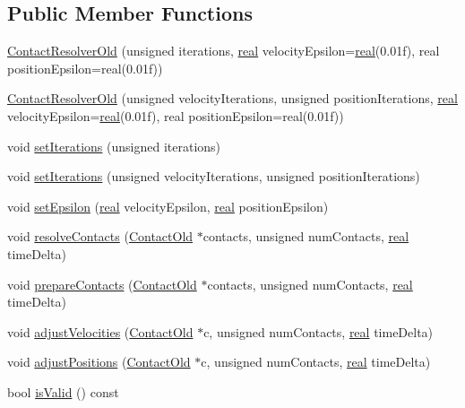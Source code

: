 \subsection*{Public Member Functions}
\begin{DoxyCompactItemize}
\item 
\mbox{\hyperlink{classr3_1_1_contact_resolver_old_a9b2d9927dcfba2d902d6c8e8f725dfcf}{Contact\+Resolver\+Old}} (unsigned iterations, \mbox{\hyperlink{namespacer3_ab2016b3e3f743fb735afce242f0dc1eb}{real}} velocity\+Epsilon=\mbox{\hyperlink{namespacer3_ab2016b3e3f743fb735afce242f0dc1eb}{real}}(0.\+01f), real position\+Epsilon=real(0.\+01f))
\item 
\mbox{\hyperlink{classr3_1_1_contact_resolver_old_a9f10b1a0e16f606009acd1b7aa4c323e}{Contact\+Resolver\+Old}} (unsigned velocity\+Iterations, unsigned position\+Iterations, \mbox{\hyperlink{namespacer3_ab2016b3e3f743fb735afce242f0dc1eb}{real}} velocity\+Epsilon=\mbox{\hyperlink{namespacer3_ab2016b3e3f743fb735afce242f0dc1eb}{real}}(0.\+01f), real position\+Epsilon=real(0.\+01f))
\item 
void \mbox{\hyperlink{classr3_1_1_contact_resolver_old_a4b113c78a4f91abfac75695f620a8dfb}{set\+Iterations}} (unsigned iterations)
\item 
void \mbox{\hyperlink{classr3_1_1_contact_resolver_old_ae5e46bdbe789c1930696f2ea291c151f}{set\+Iterations}} (unsigned velocity\+Iterations, unsigned position\+Iterations)
\item 
void \mbox{\hyperlink{classr3_1_1_contact_resolver_old_a972b47bd724a0c276d798a3e933c7aa5}{set\+Epsilon}} (\mbox{\hyperlink{namespacer3_ab2016b3e3f743fb735afce242f0dc1eb}{real}} velocity\+Epsilon, \mbox{\hyperlink{namespacer3_ab2016b3e3f743fb735afce242f0dc1eb}{real}} position\+Epsilon)
\item 
void \mbox{\hyperlink{classr3_1_1_contact_resolver_old_a2b16b59e10be1e9fc64b860bb86d149d}{resolve\+Contacts}} (\mbox{\hyperlink{classr3_1_1_contact_old}{Contact\+Old}} $\ast$contacts, unsigned num\+Contacts, \mbox{\hyperlink{namespacer3_ab2016b3e3f743fb735afce242f0dc1eb}{real}} time\+Delta)
\item 
void \mbox{\hyperlink{classr3_1_1_contact_resolver_old_aec82455efcca455ec890ad434bbdb900}{prepare\+Contacts}} (\mbox{\hyperlink{classr3_1_1_contact_old}{Contact\+Old}} $\ast$contacts, unsigned num\+Contacts, \mbox{\hyperlink{namespacer3_ab2016b3e3f743fb735afce242f0dc1eb}{real}} time\+Delta)
\item 
void \mbox{\hyperlink{classr3_1_1_contact_resolver_old_a36ab454cb770c45cba109ee8516d9711}{adjust\+Velocities}} (\mbox{\hyperlink{classr3_1_1_contact_old}{Contact\+Old}} $\ast$c, unsigned num\+Contacts, \mbox{\hyperlink{namespacer3_ab2016b3e3f743fb735afce242f0dc1eb}{real}} time\+Delta)
\item 
void \mbox{\hyperlink{classr3_1_1_contact_resolver_old_ae0e628862589a4075945d0171a05cba4}{adjust\+Positions}} (\mbox{\hyperlink{classr3_1_1_contact_old}{Contact\+Old}} $\ast$c, unsigned num\+Contacts, \mbox{\hyperlink{namespacer3_ab2016b3e3f743fb735afce242f0dc1eb}{real}} time\+Delta)
\item 
bool \mbox{\hyperlink{classr3_1_1_contact_resolver_old_ac5642b09a3e325182c7923a352f8adb4}{is\+Valid}} () const
\end{DoxyCompactItemize}
